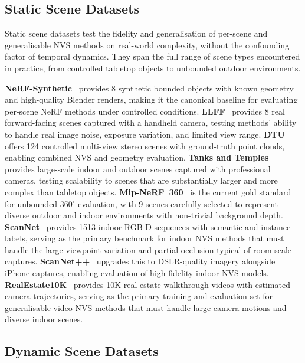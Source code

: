 \subsection{Static Scene Datasets}

Static scene datasets test the fidelity and generalisation of per-scene
and generalisable NVS methods on real-world complexity, without the
confounding factor of temporal dynamics.
They span the full range of scene types encountered in practice, from
controlled tabletop objects to unbounded outdoor environments.

\textbf{NeRF-Synthetic}~\citep{mildenhall2020nerf} provides 8 synthetic
bounded objects with known geometry and high-quality Blender renders, making it
the canonical baseline for evaluating per-scene NeRF methods under controlled
conditions.
\textbf{LLFF}~\citep{mildenhall2019llff} provides 8 real forward-facing scenes
captured with a handheld camera, testing methods' ability to handle real
image noise, exposure variation, and limited view range.
\textbf{DTU}~\citep{jensen2014dtu} offers 124 controlled multi-view stereo scenes
with ground-truth point clouds, enabling combined NVS and geometry evaluation.
\textbf{Tanks and Temples}~\citep{knapitsch2017tanks} provides large-scale
indoor and outdoor scenes captured with professional cameras, testing scalability
to scenes that are substantially larger and more complex than tabletop objects.
\textbf{Mip-NeRF~360}~\citep{barron2022mipnerf360} is the current gold standard
for unbounded 360$^\circ$ evaluation, with 9 scenes carefully selected to
represent diverse outdoor and indoor environments with non-trivial background depth.
\textbf{ScanNet}~\citep{dai2017scannet} provides 1513 indoor RGB-D sequences with
semantic and instance labels, serving as the primary benchmark for indoor NVS
methods that must handle the large viewpoint variation and partial occlusion
typical of room-scale captures.
\textbf{ScanNet++}~\citep{yeshwanth2023scannetpp} upgrades this to DSLR-quality
imagery alongside iPhone captures, enabling evaluation of high-fidelity
indoor NVS models.
\textbf{RealEstate10K}~\citep{zhou2018stereoMagnification} provides 10K real
estate walkthrough videos with estimated camera trajectories, serving as the
primary training and evaluation set for generalisable video NVS methods
that must handle large camera motions and diverse indoor scenes.

\subsection{Dynamic Scene Datasets}

